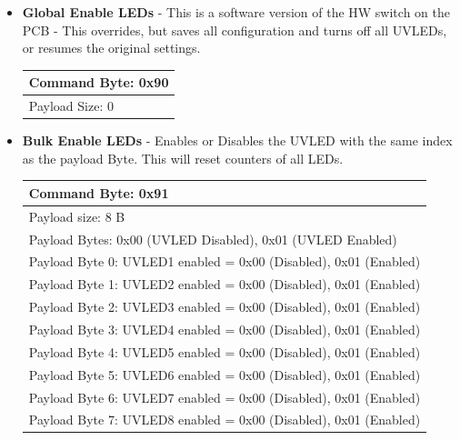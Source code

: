 \documentclass[12pt, a4paper]{article}
\begin{document}
\begin{itemize}
\item \textbf{Global Enable LEDs} - This is a software version of the HW switch on the PCB - This overrides, but saves all configuration and turns off all UVLEDs, or resumes the original settings.\\
\begin{flushleft}
\begin{tabular}{|l|}
\hline
Command Byte: 0x90													\\ \hline
Payload Size: 0														\\ \hline
\end{tabular}
\end{flushleft}

\item \textbf{Bulk Enable LEDs} - Enables or Disables the UVLED with the same index as the payload Byte. This will reset counters of all LEDs.\\
\begin{flushleft}
\begin{tabular}{|l|}
\hline
Command Byte: 0x91													\\ \hline
Payload size: 8 B													\\ \hline
Payload Bytes: 0x00 (UVLED Disabled), 0x01 (UVLED Enabled)			\\ \hline
Payload Byte 0: UVLED1 enabled =  0x00 (Disabled), 0x01 (Enabled)	\\ \hline
Payload Byte 1: UVLED2 enabled =  0x00 (Disabled), 0x01 (Enabled)	\\ \hline
Payload Byte 2: UVLED3 enabled =  0x00 (Disabled), 0x01 (Enabled)	\\ \hline
Payload Byte 3: UVLED4 enabled =  0x00 (Disabled), 0x01 (Enabled)	\\ \hline
Payload Byte 4: UVLED5 enabled =  0x00 (Disabled), 0x01 (Enabled)	\\ \hline
Payload Byte 5: UVLED6 enabled =  0x00 (Disabled), 0x01 (Enabled)	\\ \hline
Payload Byte 6: UVLED7 enabled =  0x00 (Disabled), 0x01 (Enabled)	\\ \hline
Payload Byte 7: UVLED8 enabled =  0x00 (Disabled), 0x01 (Enabled)	\\ \hline
\end{tabular}
\end{flushleft}


\end{itemize}
\end{document}
